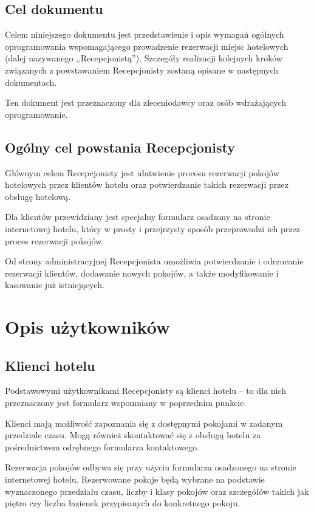 \documentclass [11pt, a4paper, leqno] {article}
\begin{document}
\subsection{Cel dokumentu}
\noindent
Celem niniejszego dokumentu jest przedstawienie i opis wymagań ogólnych oprogramowania wspomagającego prowadzenie rezerwacji miejsc hotelowych (dalej nazywanego ,,Recepcjonistą''). Szczegóły realizacji kolejnych kroków związanych z powstawaniem Recepcjonisty zostaną opisane w następnych dokumentach.

Ten dokument jest przeznaczony dla zleceniodawcy oraz osób wdrażających oprogramowanie.

\subsection{Ogólny cel powstania Recepcjonisty}
\noindent
Głównym celem Recepcjonisty jest ułatwienie procesu rezerwacji pokojów hotelowych przez klientów hotelu oraz potwierdzanie takich rezerwacji przez obsługę hotelową.

Dla klientów przewidziany jest specjalny formularz osadzony na stronie internetowej hotelu, który w prosty i przejrzysty sposób przeprowadzi ich przez proces rezerwacji pokojów.

Od strony administracyjnej Recepcjonista umożliwia potwierdzanie i odrzucanie rezerwacji klientów, dodawanie nowych pokojów, a także modyfikowanie i kasowanie już istniejących.

\section{Opis użytkowników}

\subsection{Klienci hotelu}
\noindent
Podstawowymi użytkownikami Recepcjonisty są klienci hotelu -- to dla nich przeznaczony jest formularz wspomniany w poprzednim punkcie.

Klienci mają możliwość zapoznania się z dostępnymi pokojami w zadanym przedziale czasu. Mogą również skontaktować się z obsługą hotelu za pośrednictwem odrębnego formularza kontaktowego.

Rezerwacja pokojów odbywa się przy użyciu formularza osadzonego na stronie internetowej hotelu. Rezerwowane pokoje będą wybrane na podstawie wyznaczonego przedziału czasu, liczby i klasy pokojów oraz szczegółów takich jak piętro czy liczba łazienek przypisanych do konkretnego pokoju.
\end{document}
